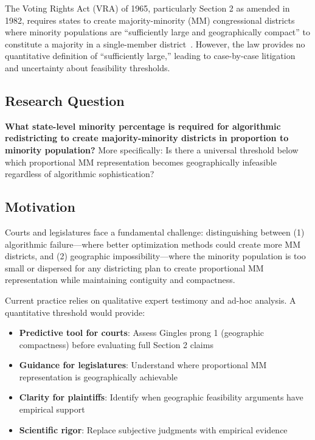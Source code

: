 The Voting Rights Act (VRA) of 1965, particularly Section 2 as amended in 1982, requires states to create majority-minority (MM) congressional districts where minority populations are ``sufficiently large and geographically compact'' to constitute a majority in a single-member district~\citep{thornburg1986}. However, the law provides no quantitative definition of ``sufficiently large,'' leading to case-by-case litigation and uncertainty about feasibility thresholds.

\subsection{Research Question}

\textbf{What state-level minority percentage is required for algorithmic redistricting to create majority-minority districts in proportion to minority population?} More specifically: Is there a universal threshold below which proportional MM representation becomes geographically infeasible regardless of algorithmic sophistication?

\subsection{Motivation}

Courts and legislatures face a fundamental challenge: distinguishing between (1) algorithmic failure---where better optimization methods could create more MM districts, and (2) geographic impossibility---where the minority population is too small or dispersed for any districting plan to create proportional MM representation while maintaining contiguity and compactness.

Current practice relies on qualitative expert testimony and ad-hoc analysis. A quantitative threshold would provide:
\begin{itemize}
    \item \textbf{Predictive tool for courts}: Assess Gingles prong 1 (geographic compactness) before evaluating full Section 2 claims
    \item \textbf{Guidance for legislatures}: Understand where proportional MM representation is geographically achievable
    \item \textbf{Clarity for plaintiffs}: Identify when geographic feasibility arguments have empirical support
    \item \textbf{Scientific rigor}: Replace subjective judgments with empirical evidence
\end{itemize}

